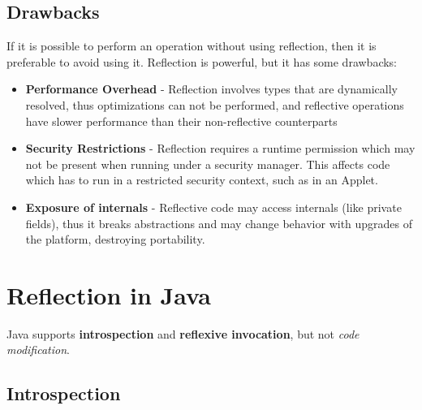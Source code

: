 \subsection{Drawbacks}
If it is possible to perform an operation without using reflection, then it is
preferable to avoid using it. Reflection is powerful, but it has some drawbacks:
\begin{itemize}
    \item \textbf{Performance Overhead} - Reflection involves types that are dynamically resolved, thus optimizations
    can not be performed, and reflective operations have slower performance
    than their non-reflective counterparts
    \item \textbf{Security Restrictions} - Reflection requires a runtime permission which may not be present when
    running under a security manager. This affects code which has to run in a
    restricted security context, such as in an Applet.
    \item \textbf{Exposure of internals} - Reflective code may access internals (like private fields), thus it breaks
    abstractions and may change behavior with upgrades of the platform,
    destroying portability.
\end{itemize}

\section{Reflection in Java}
Java supports \textbf{introspection} and \textbf{reflexive invocation},
but not \textit{code modification}.

\subsection{Introspection}

